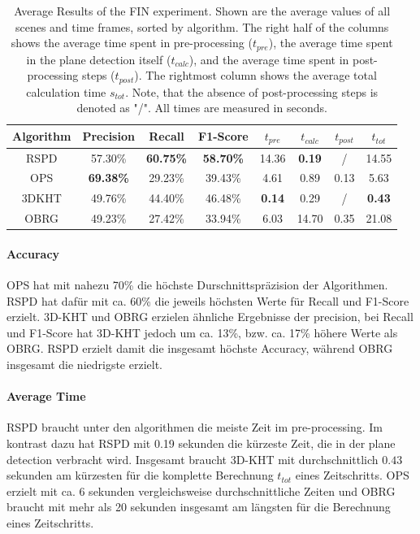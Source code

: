 \documentclass[main.tex]{subfiles}
\begin{document}
\begin{table}[H]
    \centering
    \begin{tabular}{c|cccccc|c}
        Algorithm & Precision        & Recall           & F1-Score         & $t_{pre}$     & $t_{calc}$    & $t_{post}$ & $t_{tot}$     \\ \hline
        RSPD      & 57.30\%          & \textbf{60.75\%} & \textbf{58.70\%} & 14.36         & \textbf{0.19} & /          & 14.55         \\
        OPS       & \textbf{69.38\%} & 29.23\%          & 39.43\%          & 4.61          & 0.89          & 0.13       & 5.63          \\
        3DKHT     & 49.76\%          & 44.40\%          & 46.48\%          & \textbf{0.14} & 0.29          & /          & \textbf{0.43} \\
        OBRG      & 49.23\%          & 27.42\%          & 33.94\%          & 6.03          & 14.70         & 0.35       & 21.08
    \end{tabular}
    \caption[Average FIN Results]{Average Results of the FIN experiment. Shown are the average values of all scenes and time frames, sorted by
        algorithm. The right half of the columns shows the average time spent in pre-processing ($t_{pre}$), the average time spent in the plane
        detection itself ($t_{calc}$), and the average time spent in post-processing steps ($t_{post}$).
        The rightmost column shows the average total calculation time $s_{tot}$.
        Note, that the absence of post-processing steps is denoted as "/".
        All times are measured in seconds.}
    \label{tab:res-fin-total}
\end{table}

\paragraph{Accuracy}
OPS hat mit nahezu 70\% die höchste Durschnittspräzision der Algorithmen. RSPD hat dafür mit ca. 60\% die jeweils höchsten
Werte für Recall und F1-Score erzielt. 3D-KHT und OBRG erzielen ähnliche Ergebnisse der precision, bei Recall und
F1-Score hat 3D-KHT jedoch um ca. 13\%, bzw. ca. 17\% höhere Werte als OBRG. 
RSPD erzielt damit die insgesamt höchste Accuracy, während OBRG insgesamt die niedrigste erzielt.

\paragraph{Average Time}
RSPD braucht unter den algorithmen die meiste Zeit im pre-processing. Im kontrast dazu hat RSPD mit 0.19 sekunden
die kürzeste Zeit, die in der plane detection verbracht wird. Insgesamt braucht 3D-KHT mit durchschnittlich $0.43$
sekunden am kürzesten für die komplette Berechnung $t_{tot}$ eines Zeitschritts. OPS erzielt mit ca. 6 sekunden vergleichsweise
durchschnittliche Zeiten und OBRG braucht mit mehr als 20 sekunden insgesamt am längsten für die Berechnung
eines Zeitschritts.
\end{document}
